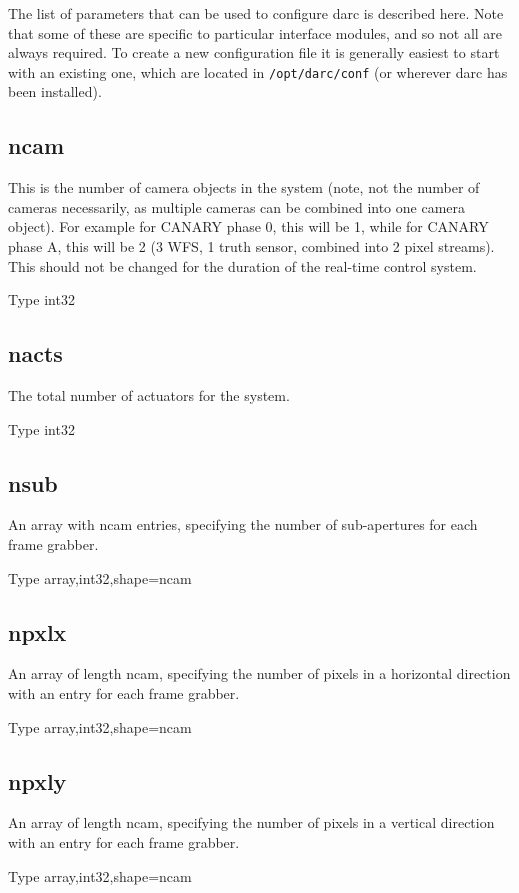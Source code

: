 \documentclass[a4,10pt]{article}
\begin{document}
The list of parameters that can be used to configure darc is described
here.  Note that some of these are specific to particular interface
modules, and so not all are always required.  To create a new
configuration file it is generally easiest to start with an existing
one, which are located in {\tt /opt/darc/conf} (or wherever darc has
been installed).


\subsection{ncam}
This is the number of camera objects in the system (note, not
the number of cameras necessarily, as multiple cameras can be combined
into one camera object).  For example for CANARY phase 0, this will be
1, while for CANARY phase A, this will be 2 (3 WFS, 1 truth sensor,
combined into 2 pixel streams).  This should not be changed for the
duration of the real-time control system.

Type int32

\subsection{nacts}
The total number of actuators for the system.  

Type int32

\subsection{nsub}
An array with ncam entries, specifying the number of sub-apertures for
each frame grabber.

Type array,int32,shape=ncam

\subsection{npxlx}
An array of length ncam, specifying the number of pixels in a
horizontal direction with an entry for each frame grabber.

Type array,int32,shape=ncam

\subsection{npxly}
An array of length ncam, specifying the number of pixels in a
vertical direction with an entry for each frame grabber.

Type array,int32,shape=ncam
\end{document}
